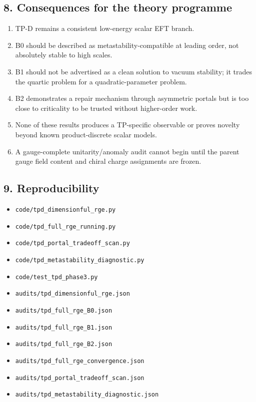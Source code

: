 \documentclass[
]{article}
\providecommand{\tightlist}{%
  \setlength{\itemsep}{0pt}\setlength{\parskip}{0pt}}
\begin{document}
\hypertarget{consequences-for-the-theory-programme}{%
\subsection{8. Consequences for the theory
programme}\label{consequences-for-the-theory-programme}}

\begin{enumerate}
\def\labelenumi{\arabic{enumi}.}
\tightlist
\item
  TP-D remains a consistent low-energy scalar EFT branch.
\item
  B0 should be described as metastability-compatible at leading order,
  not absolutely stable to high scales.
\item
  B1 should not be advertised as a clean solution to vacuum stability;
  it trades the quartic problem for a quadratic-parameter problem.
\item
  B2 demonstrates a repair mechanism through asymmetric portals but is
  too close to criticality to be trusted without higher-order work.
\item
  None of these results produces a TP-specific observable or proves
  novelty beyond known product-discrete scalar models.
\item
  A gauge-complete unitarity/anomaly audit cannot begin until the parent
  gauge field content and chiral charge assignments are frozen.
\end{enumerate}

\hypertarget{reproducibility-1}{%
\subsection{9. Reproducibility}\label{reproducibility-1}}

\begin{itemize}
\tightlist
\item
  \texttt{code/tpd\_dimensionful\_rge.py}
\item
  \texttt{code/tpd\_full\_rge\_running.py}
\item
  \texttt{code/tpd\_portal\_tradeoff\_scan.py}
\item
  \texttt{code/tpd\_metastability\_diagnostic.py}
\item
  \texttt{code/test\_tpd\_phase3.py}
\item
  \texttt{audits/tpd\_dimensionful\_rge.json}
\item
  \texttt{audits/tpd\_full\_rge\_B0.json}
\item
  \texttt{audits/tpd\_full\_rge\_B1.json}
\item
  \texttt{audits/tpd\_full\_rge\_B2.json}
\item
  \texttt{audits/tpd\_full\_rge\_convergence.json}
\item
  \texttt{audits/tpd\_portal\_tradeoff\_scan.json}
\item
  \texttt{audits/tpd\_metastability\_diagnostic.json}
\end{itemize}
\end{document}

